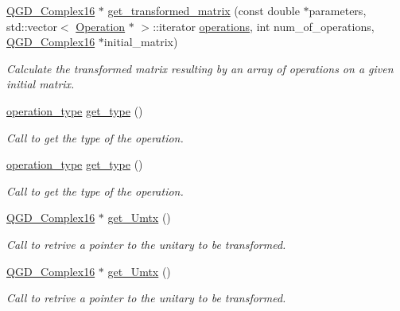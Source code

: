 \begin{DoxyCompactItemize}
\hyperlink{struct_q_g_d___complex16}{Q\+G\+D\+\_\+\+Complex16} $\ast$ \hyperlink{class_decomposition___base_a74159036ee14ac2c33a0ccd45de782d5}{get\+\_\+transformed\+\_\+matrix} (const double $\ast$parameters, std\+::vector$<$ \hyperlink{class_operation}{Operation} $\ast$ $>$\+::iterator \hyperlink{class_operation__block_a1efec4139888e591b59acd7b84497af1}{operations}, int num\+\_\+of\+\_\+operations, \hyperlink{struct_q_g_d___complex16}{Q\+G\+D\+\_\+\+Complex16} $\ast$initial\+\_\+matrix)
\begin{DoxyCompactList}\small\item\em Calculate the transformed matrix resulting by an array of operations on a given initial matrix. \end{DoxyCompactList}\item 
\hyperlink{operations_2include_2_operation_8h_ad99e62941c8e4b13e5fc45ecaaf65eff}{operation\+\_\+type} \hyperlink{class_operation_acc601a7a00616fd6e2a61f61e084afac}{get\+\_\+type} ()
\begin{DoxyCompactList}\small\item\em Call to get the type of the operation. \end{DoxyCompactList}\item 
\hyperlink{operations_2include_2_operation_8h_ad99e62941c8e4b13e5fc45ecaaf65eff}{operation\+\_\+type} \hyperlink{class_operation_acc601a7a00616fd6e2a61f61e084afac}{get\+\_\+type} ()
\begin{DoxyCompactList}\small\item\em Call to get the type of the operation. \end{DoxyCompactList}\item 
\hyperlink{struct_q_g_d___complex16}{Q\+G\+D\+\_\+\+Complex16} $\ast$ \hyperlink{class_decomposition___base_a8375551739dde405c4e121ae0bbb09bf}{get\+\_\+\+Umtx} ()
\begin{DoxyCompactList}\small\item\em Call to retrive a pointer to the unitary to be transformed. \end{DoxyCompactList}\item 
\hyperlink{struct_q_g_d___complex16}{Q\+G\+D\+\_\+\+Complex16} $\ast$ \hyperlink{class_decomposition___base_ad1e8fca5e5710d3a59f10ed6c523a502}{get\+\_\+\+Umtx} ()
\begin{DoxyCompactList}\small\item\em Call to retrive a pointer to the unitary to be transformed. \end{DoxyCompactList}\item 

\end{DoxyCompactItemize}
